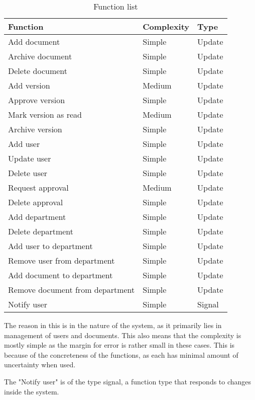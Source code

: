 \begin{table}[H]
\centering
\begin{tabular}{lll}
	\hline
	Function						& Complexity & Type    \\
	\hline
	Add document					& Simple     & Update  \\
	Archive document				& Simple     & Update  \\
	Delete document					& Simple     & Update  \\
	Add version						& Medium	 & Update  \\
	Approve version					& Simple     & Update  \\
	Mark version as read			& Medium     & Update  \\ 
	Archive version					& Simple     & Update  \\
	Add user						& Simple     & Update  \\
	Update user						& Simple     & Update  \\
	Delete user						& Simple     & Update  \\
	Request approval				& Medium     & Update  \\
	Delete approval					& Simple     & Update  \\
	Add department					& Simple     & Update  \\
	Delete department				& Simple	 & Update  \\
	Add user to department			& Simple     & Update  \\
	Remove user from department		& Simple     & Update  \\
	Add document to department		& Simple     & Update  \\
	Remove document from department & Simple     & Update  \\
	Notify user						& Simple	 & Signal  \\
	\hline
\end{tabular}
\caption{Function list}
\end{table}

The reason in this is in the nature of the system, as it primarily lies in management of users and documents.
This also means that the complexity is mostly simple as the margin for error is rather small in these cases.
This is because of the concreteness of the functions, as each has minimal amount of uncertainty when used.


The "Notify user" is of the type signal, a function type that responds to changes inside the system.

